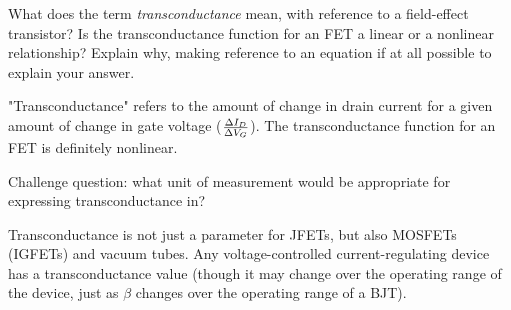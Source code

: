 

What does the term {\it transconductance} mean, with reference to a field-effect transistor?  Is the transconductance function for an FET a linear or a nonlinear relationship?  Explain why, making reference to an equation if at all possible to explain your answer.







"Transconductance" refers to the amount of change in drain current for a given amount of change in gate voltage (${\Delta I_D \over \Delta V_G}$).  The transconductance function for an FET is definitely nonlinear.

\vskip 10pt

Challenge question: what unit of measurement would be appropriate for expressing transconductance in?







Transconductance is not just a parameter for JFETs, but also MOSFETs (IGFETs) and vacuum tubes.  Any voltage-controlled current-regulating device has a transconductance value (though it may change over the operating range of the device, just as $\beta$ changes over the operating range of a BJT).




